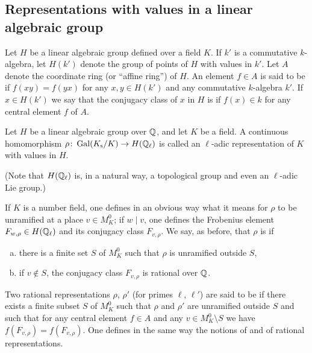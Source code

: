 \subsection{Representations with values in a linear algebraic group}
\label{sec:I_24}
Let $H$ be a linear algebraic group defined over a field $K$. If
$k'$ is a commutative $k$-algebra, let $H(k')$ denote the group of points
of $H$ with values in $k'$. Let $A$ denote the coordinate ring (or
``affine ring'') of $H$. An element $f \in A$ is said to be  if
$f(xy) = f(yx)$ for any $x, y \in H(k')$ and any commutative $k$-algebra
$k'$. If $x \in H(k')$ we say that the conjugacy class of $x$ in $H$ is
 if $f(x) \in k$ for any central element $f$ of $A$.

\begin{mydef}
Let $H$ be a linear algebraic group over $\mathbb{Q}$, and let
$K$ be a field. A continuous homomorphism $\rho \colon \operatorname{Gal}(K_{\mathrm{s}}/K) \to H(\mathbb{Q}_\ell)$
is called an $\ell$-adic representation of $K$ with values in $H$.
\end{mydef}
(Note that $H(\mathbb{Q}_\ell)$ is, in a natural way, a topological group and even
an $\ell$-adic Lie group.)

If $K$ is a number field, one defines in an obvious way what it
\dpage
means for $\rho$ to be unramified at a place $v \in M_K^0$; if $w\mid v$, one
defines the Frobenius element $F_{w, \rho} \in H(\mathbb{Q}_\ell)$ and its conjugacy
class $F_{v, \rho}$. We say, as before, that $\rho$ is  if
\begin{enumerate}[(a)]
\item\label{ax:rational_ladic_a}
	there is a finite set $S$ of $M_K^0$ such that $\rho$ is unramified
	outside $S$,
\item\label{ax:rational_ladic_b}
	if $v \notin S$, the conjugacy class $F_{v, \rho}$ is rational over $\mathbb{Q}$.
\end{enumerate}
Two rational representations $\rho$, $\rho'$ (for primes $\ell$, $\ell'$) are said to
be  if there exists a finite subset $S$ of $M_K^0$ such that $\rho$
and $\rho'$ are unramified outside $S$ and such that for any central 
element $f \in A$ and any $v \in M_K^0 \setminus S$ we have $f(F_{v, \rho}) =
f(F_{v, \rho})$. One defines in the same way the notions of 
and  of rational representations.

